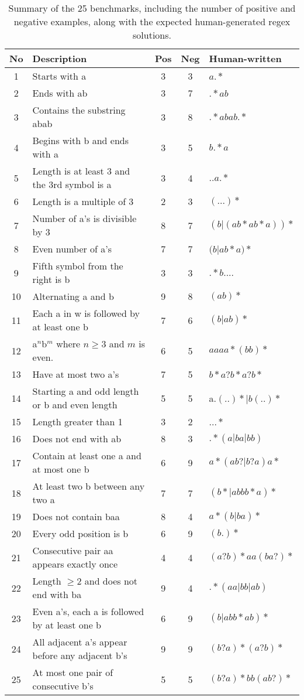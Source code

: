\begin{table}[h!]
	\centering
	\label{tab:alpha_regex_benchmarks_summary}
	\caption{Summary of the 25 benchmarks, including the number of positive and negative examples, along with the expected human-generated regex solutions.}
	\begin{tabular}{|c|l|c|c|l|}
	\hline
	\textbf{No} & \textbf{Description} & \textbf{Pos} & \textbf{Neg} & \textbf{Human-written} \\
	\hline
	1 & Starts with a & 3 & 3 & $a.*$ \\
	2 & Ends with ab & 3 & 7 & $.*ab$ \\
	3 & Contains the substring abab & 3 & 8 & $.*abab.*$ \\
	4 & Begins with b and ends with a & 3 & 5 & $b.*a$ \\
	5 & Length is at least 3 and the 3rd symbol is a & 3 & 4 & $..a.*$ \\
	6 & Length is a multiple of 3 & 2 & 3 & $(...)*$ \\
	7 & Number of a's is divisible by 3 & 8 & 7 & $(b|(ab*ab*a))*$ \\
	8 & Even number of a's & 7 & 7 & $(b$|$ab*a)*$ \\
	9 & Fifth symbol from the right is b & 3 & 3 & $.*b....$ \\
	10 & Alternating a and b & 9 & 8 & $(ab)*$ \\
	11 & Each a in w is followed by at least one b & 7 & 6 & $(b|ab)*$ \\
	12 & a$^n$b$^m$ where $n \geq 3$ and $m$ is even. & 6 & 5 & $aaaa*(bb)*$ \\
	13 & Have at most two a's & 7 & 5 & $b*a?b*a?b*$ \\
	14 & Starting a and odd length or b and even length & 5 & 5 & a.$(..)*|b(..)*$ \\
	15 & Length greater than 1 & 3 & 2 & $...*$ \\
	16 & Does not end with ab & 8 & 3 & $.*(a|ba|bb)$ \\
	17 & Contain at least one a and at most one b & 6 & 9 & $a*(ab?|b?a)a*$ \\
	18 & At least two b between any two a & 7 & 7 & $(b*|abbb*a)*$ \\
	19 & Does not contain baa & 8 & 4 & $a*(b|ba)*$ \\
	20 & Every odd position is b & 6 & 9 & $(b.)*$ \\
	21 & Consecutive pair aa appears exactly once & 4 & 4 & $(a?b)*aa(ba?)*$ \\
	22 & Length $\ge 2$ and does not end with ba & 9 & 4 & $.*(aa|bb|ab)$ \\
	23 & Even a's, each a is followed by at least one b & 6 & 9 & $(b|abb*ab)*$ \\
	24 & All adjacent a's appear before any adjacent b's & 9 & 9 & $(b?a)*(a?b)*$ \\
	25 & At most one pair of consecutive b's & 5 & 5 & $(b?a)*bb(ab?)*$ \\
	\hline
\end{tabular}
\end{table}



